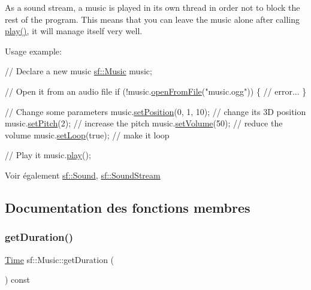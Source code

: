 As a sound stream, a music is played in its own thread in order not to block the rest of the program. This means that you can leave the music alone after calling \hyperlink{classsf_1_1SoundStream_afdc08b69cab5f243d9324940a85a1144}{play()}, it will manage itself very well.

Usage example\+: 
\begin{DoxyCode}
\textcolor{comment}{// Declare a new music}
\hyperlink{classsf_1_1Music}{sf::Music} music;

\textcolor{comment}{// Open it from an audio file}
\textcolor{keywordflow}{if} (!music.\hyperlink{classsf_1_1Music_a3edc66e5f5b3f11e84b90eaec9c7d7c0}{openFromFile}(\textcolor{stringliteral}{"music.ogg"}))
\{
    \textcolor{comment}{// error...}
\}

\textcolor{comment}{// Change some parameters}
music.\hyperlink{classsf_1_1SoundSource_a0480257ea25d986eba6cc3c1a6f8d7c2}{setPosition}(0, 1, 10); \textcolor{comment}{// change its 3D position}
music.\hyperlink{classsf_1_1SoundSource_a72a13695ed48b7f7b55e7cd4431f4bb6}{setPitch}(2);           \textcolor{comment}{// increase the pitch}
music.\hyperlink{classsf_1_1SoundSource_a2f192f2b49fb8e2b82f3498d3663fcc2}{setVolume}(50);         \textcolor{comment}{// reduce the volume}
music.\hyperlink{classsf_1_1SoundStream_a43fade018ffba7e4f847a9f00b353f3d}{setLoop}(\textcolor{keyword}{true});         \textcolor{comment}{// make it loop}

\textcolor{comment}{// Play it}
music.\hyperlink{classsf_1_1SoundStream_afdc08b69cab5f243d9324940a85a1144}{play}();
\end{DoxyCode}


\begin{DoxySeeAlso}{Voir également}
\hyperlink{classsf_1_1Sound}{sf\+::\+Sound}, \hyperlink{classsf_1_1SoundStream}{sf\+::\+Sound\+Stream} 
\end{DoxySeeAlso}


\subsection{Documentation des fonctions membres}
\mbox{\label{classsf_1_1Music_a288ef6f552a136b0e56952dcada3d672}} 
\subsubsection{\texorpdfstring{get\+Duration()}{getDuration()}}
{\footnotesize\ttfamily \hyperlink{classsf_1_1Time}{Time} sf\+::\+Music\+::get\+Duration (\begin{DoxyParamCaption}{ }\end{DoxyParamCaption}) const}




